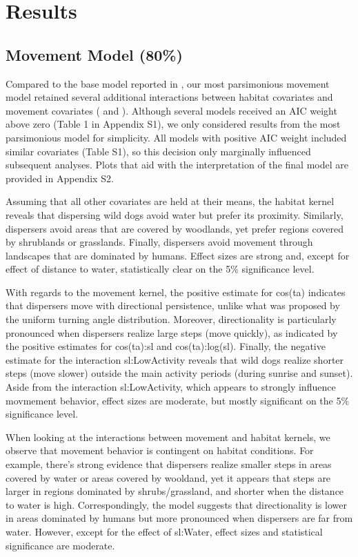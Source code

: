 \documentclass[abstract=on,10pt,a4paper,bibliography=totocnumbered]{article}
\begin{document}
\section{Results}
\subsection{Movement Model (80\%)}
Compared to the base model reported in \citep{Hofmann.2021}, our most
parsimonious movement model retained several additional interactions between
habitat covariates and movement covariates ( and
). Although several models received an AIC weight
above zero (Table 1 in Appendix S1), we only considered results from the most
parsimonious model for simplicity. All models with positive AIC weight included
similar covariates (Table S1), so this decision only marginally influenced
subsequent analyses. Plots that aid with the interpretation of the final model
are provided in Appendix S2.

Assuming that all other covariates are held at their means, the habitat kernel
reveals that dispersing wild dogs avoid water but prefer its proximity.
Similarly, dispersers avoid areas that are covered by woodlands, yet prefer
regions covered by shrublands or grasslands. Finally, dispersers avoid movement
through landscapes that are dominated by humans. Effect sizes are strong and,
except for effect of \textsf{distance to water}, statistically clear on the 5\%
significance level.

With regards to the movement kernel, the positive estimate for \textsf{cos(ta)}
indicates that dispersers move with directional persistence, unlike what was
proposed by the uniform turning angle distribution. Moreover, directionality is
particularly pronounced when dispersers realize large steps (move quickly), as
indicated by the positive estimates for \textsf{cos(ta):sl} and
\textsf{cos(ta):log(sl)}. Finally, the negative estimate for the interaction
\textsf{sl:LowActivity} reveals that wild dogs realize shorter steps (move
slower) outside the main activity periods (during sunrise and sunset). Aside
from the interaction \textsf{sl:LowActivity}, which appears to strongly
influence movmement behavior, effect sizes are moderate, but mostly significant
on the 5\% significance level.

When looking at the interactions between movement and habitat kernels, we
observe that movement behavior is contingent on habitat conditions. For example,
there's strong evidence that dispersers realize smaller steps in areas covered
by water or areas covered by wooldand, yet it appears that steps are larger in
regions dominated by shrubs/grassland, and shorter when the distance to water is
high. Correspondingly, the model suggests that directionality is lower in areas
dominated by humans but more pronounced when dispersers are far from water.
However, except for the effect of \textsf{sl:Water}, effect sizes and
statistical significance are moderate.
\end{document}
